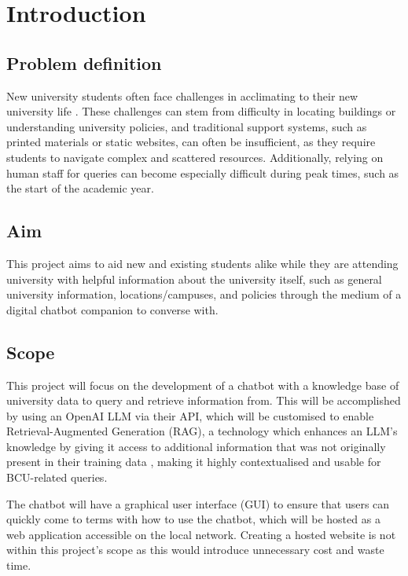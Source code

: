\chapter{Introduction}


\section{Problem definition}
New university students often face challenges in acclimating to their new university life \autocite{oxforduniversitySupportingAcademicTransition}.
These challenges can stem from difficulty in locating buildings or understanding university policies, and traditional support systems, 
such as printed materials or static websites, can often be insufficient, as they require students to navigate complex 
and scattered resources. Additionally, relying on human staff for queries can become especially difficult during 
peak times, such as the start of the academic year.


\section{Aim}
This project aims to aid new and existing students alike while they are attending university with 
helpful information about the university itself, such as general university information, locations/campuses, 
and policies through the medium of a digital chatbot companion to converse with.

\section{Scope}
This project will focus on the development of a chatbot with a knowledge base of university data to query and retrieve information from.
This will be accomplished by using an OpenAI LLM via their API, which will be customised to enable Retrieval-Augmented Generation (RAG),
a technology which enhances an LLM's knowledge by giving it access to additional information that was not originally present in their training data
\autocite{lewis_retrieval-augmented_2021}, making it highly contextualised and usable for BCU-related queries.

\para The chatbot will have a graphical user interface (GUI) to ensure that users can quickly come to terms with how to use the chatbot,
which will be hosted as a web application accessible on the local network. Creating a hosted website is not within this project's scope as this 
would introduce unnecessary cost and waste time.


